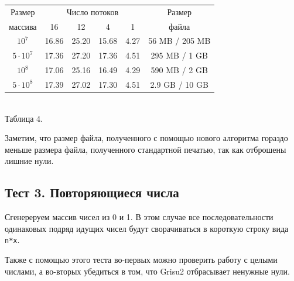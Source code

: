 \begin{center}
\begin{tabular}{||c|c|c|c|c|c||}
\hline
\hline
Размер & \multicolumn{4}{c|}{Число потоков} & Размер\\
\hhline{~|-|-|-|-|~|}
массива & 16 & 12 & 4 & 1 & файла \\
\hline
$10^7$  & 16.86 & 25.20 & 15.68 & 4.27 & 56 MB / 205 MB \\
\hline
$5 \cdot 10^7$ & 17.36 & 27.20 & 17.36 & 4.51 & 295 MB / 1 GB\\
\hline
$10^8$ & 17.06 & 25.16 & 16.49 & 4.29 & 590 MB / 2 GB \\
\hline
$5 \cdot 10^8$ & 17.39 & 27.02 & 17.30 & 4.51 & 2.9 GB / 10 GB\\
\hline
\hline
\end{tabular}
\\\vspace{10pt}
\small{Таблица 4.}
\end{center}
Заметим, что размер файла, полученного с помощью нового алгоритма гораздо меньше размера файла, полученного стандартной печатью, так как отброшены лишние нули.

\subsection{Тест 3. Повторяющиеся числа}
Сгенереруем массив чисел из 0 и 1.
В этом случае все последовательности одинаковых подряд идущих чисел будут сворачиваться в короткую строку вида \texttt{n*x}.

Также с помощью этого теста во-первых можно проверить работу с целыми числами, а во-вторых убедиться в том, что \textsf{Grisu2} отбрасывает ненужные нули.

